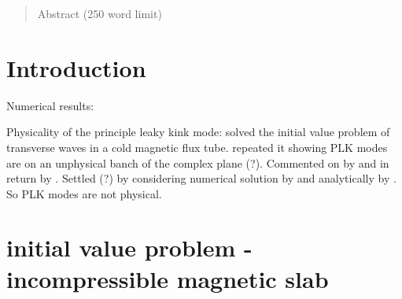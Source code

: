 \documentclass{aastex61}
\begin{document}

\author[0000-0002-0771-743X]{Matthew Allcock}

\author[0000-0003-3439-4127]{Robert Erd\'{e}lyi}


\begin{abstract}

Abstract (250 word limit)

\end{abstract}


\section{Introduction} \label{sec:intro}
Numerical results: \cite{ter_etal06}

Physicality of the principle leaky kink mode: \cite{cal03} solved the initial value problem of transverse waves in a cold magnetic flux tube. \cite{rud_etal06} repeated it showing PLK modes are on an unphysical banch of the complex plane (?). Commented on by \cite{cal06} and in return by \cite{rud_etal06b}. Settled (?) by considering numerical solution by \cite{ter_etal07} and analytically by \cite{and_etal07}. So PLK modes are not physical.

\section{initial value problem - incompressible magnetic slab}
\end{document}
